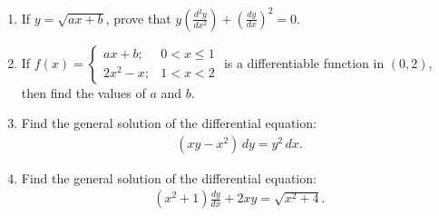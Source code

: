 \documentclass{article}
\begin{document}
\begin{enumerate}
\item If $y = \sqrt{ax+b}$, prove that $y \left(\frac{d^2y}{dx^2}\right) + \left(\frac{dy}{dx}\right)^2 = 0$.

\item If $f(x) =
\begin{cases}
ax + b  ; & 0 < x \leq 1 \\
2x^2 - x ; & 1 < x < 2
\end{cases}$ is a differentiable function in $(0, 2)$, then find the values of $a$ and $b$.
\item Find the general solution of the differential equation: \begin{align}
		(xy - x^2) \, dy = y^2 \, dx.
\end{align}

\item  Find the general solution of the differential equation:
	\begin{align}
		(x^2 + 1)\frac{dy}{dx} + 2xy = \sqrt{x^2+4}.
	\end{align}
	
\end{enumerate}
\end{document}
